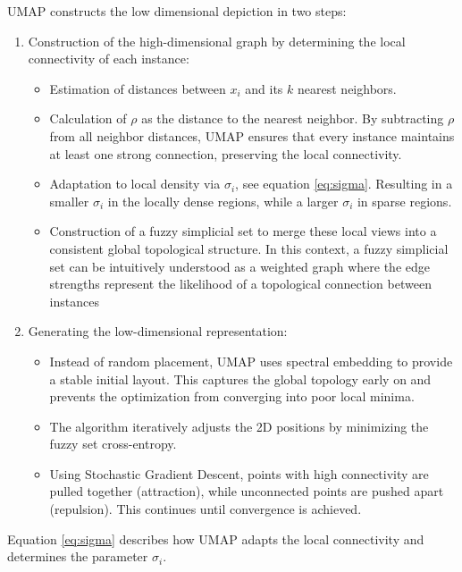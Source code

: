 UMAP constructs the low dimensional depiction in two steps:
\begin{enumerate}
    \item   Construction of the high-dimensional graph by determining the local connectivity of each instance: 
    \begin{itemize}
        \item   Estimation of distances between $x_i$ and its $k$ nearest neighbors.
        \item   Calculation of $\rho$ as the distance to the nearest neighbor. 
                By subtracting $\rho$ from all neighbor distances, UMAP ensures that every instance maintains at least one strong connection, preserving the local connectivity.
        \item   Adaptation to local density via $\sigma_i$, see equation \ref{eq:sigma}.
                Resulting in a smaller $\sigma_i$ in the locally dense regions, while a larger $\sigma_i$ in sparse regions.
        \item   Construction of a fuzzy simplicial set to merge these local views into a consistent global topological structure.
                In this context, a fuzzy simplicial set can be intuitively understood as a weighted graph where the edge strengths represent the likelihood of a topological connection between instances
    \end{itemize}
    \item   Generating the low-dimensional representation:
    \begin{itemize}
        \item   Instead of random placement, UMAP uses spectral embedding to provide a stable initial layout. 
                This captures the global topology early on and prevents the optimization from converging into poor local minima.
        \item   The algorithm iteratively adjusts the 2D positions by minimizing the fuzzy set cross-entropy.
        \item   Using Stochastic Gradient Descent, points with high connectivity are pulled together (attraction), while unconnected points are pushed apart (repulsion). 
                This continues until convergence is achieved.
    \end{itemize}
\end{enumerate}
\citep[p. 6]{mcinnes2018umap}

Equation \ref{eq:sigma} describes how UMAP adapts the local connectivity and determines the parameter $\sigma_i$.

